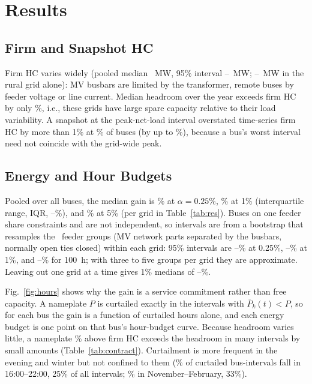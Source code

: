 \documentclass[conference,letterpaper]{IEEEtran}
\begin{document}


\section{Results}
\subsection{Firm and Snapshot HC}
Firm HC varies widely (pooled median \firmPoolMed~MW, 95\% interval \ciFirmLo--\ciFirmHi~MW; \firmminRur--\firmmaxRur~MW in the rural grid alone): MV busbars are limited by the transformer, remote buses by feeder voltage or line current. Median headroom over the year exceeds firm HC by only \spreadMed\%, i.e., these grids have large spare capacity relative to their load variability. A snapshot at the peak-net-load interval overstated time-series firm HC by more than 1\% at \snapOverShare\% of buses (by up to \snapOverMax\%), because a bus's worst interval need not coincide with the grid-wide peak.

\subsection{Energy and Hour Budgets}
Pooled over all buses, the median gain is \poolGamed\% at $\alpha=0.25\%$, \poolGcmed\% at 1\% (interquartile range, IQR, \poolGcqa--\poolGcqc\%), and \poolGdmed\% at 5\% (per grid in Table~\ref{tab:res}). Buses on one feeder share constraints and are not independent, so intervals are from a bootstrap that resamples the \nClusters~feeder groups (MV network parts separated by the busbars, normally open ties closed) within each grid: 95\% intervals are \ciGqLo--\ciGqHi\% at 0.25\%, \ciGoneLo--\ciGoneHi\% at 1\%, and \ciHLo--\ciHHi\% for 100~h; with three to five groups per grid they are approximate. Leaving out one grid at a time gives 1\% medians of \logoLo--\logoHi\%.

Fig.~\ref{fig:hours} shows why the gain is a service commitment rather than free capacity. A nameplate $P$ is curtailed exactly in the intervals with $\bar P_k(t)<P$, so for each bus the gain is a function of curtailed hours alone, and each energy budget is one point on that bus's hour-budget curve. Because headroom varies little, a nameplate \poolGcmed\% above firm HC exceeds the headroom in many intervals by small amounts (Table~\ref{tab:contract}). Curtailment is more frequent in the evening and winter but not confined to them (\eveShare\% of curtailed bus-intervals fall in 16:00--22:00, 25\% of all intervals; \winShare\% in November--February, 33\%).
\end{document}
